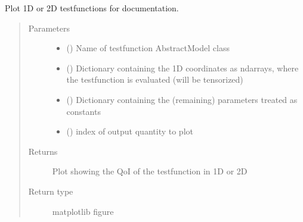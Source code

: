 \documentclass[letterpaper,10pt,english,openany,oneside]{sphinxmanual}
\begin{document}
\begin{fulllineitems}
\label{\detokenize{pygpc.testfunctions:pygpc.testfunctions.testfunctions.plot_testfunction}}
Plot 1D or 2D testfunctions for documentation.
\begin{quote}\begin{description}
\item[{Parameters}] \leavevmode\begin{itemize}
\item {} 
 () \textendash{} Name of testfunction AbstractModel class

\item {} 
 () \textendash{} Dictionary containing the 1D coordinates as ndarrays, where the testfunction is evaluated (will be tensorized)

\item {} 
 (\sphinxstyleliteralemphasis{\sphinxupquote{ (}}\sphinxstyleliteralemphasis{\sphinxupquote{)}}) \textendash{} Dictionary containing the (remaining) parameters treated as constants

\item {} 
 () \textendash{} index of output quantity to plot

\end{itemize}

\item[{Returns}] \leavevmode
{} \textendash{} Plot showing the QoI of the testfunction in 1D or 2D

\item[{Return type}] \leavevmode
matplotlib figure

\end{description}\end{quote}

\end{fulllineitems}
\end{document}
